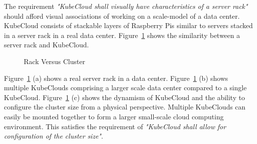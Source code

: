 \noindent
The requirement \textit{"KubeCloud shall visually have characteristics of a server rack"} should afford visual associations of working on a scale-model of a data center. KubeCloud consists of stackable layers of Raspberry Pis similar to servers stacked in a server rack in a real data center. Figure~\ref{fig:server_rack} shows the similarity between a server rack and KubeCloud. 

\begin{figure}[H]%
    \centering
    \qquad
    \qquad
    \caption{Rack Versus Cluster}%
    \label{fig:server_rack}%
\end{figure}

\noindent
Figure~\ref{fig:server_rack} (a) shows a real server rack in a data center. Figure~\ref{fig:server_rack} (b) shows multiple KubeClouds comprising a larger scale data center compared to a single KubeCloud. Figure~\ref{fig:server_rack} (c) shows the dynamism of KubeCloud and the ability to configure the cluster size from a physical perspective. Multiple KubeClouds can easily be mounted together to form a larger small-scale cloud computing environment. This satisfies the requirement of \textit{"KubeCloud shall allow for configuration of the cluster size"}. \\

